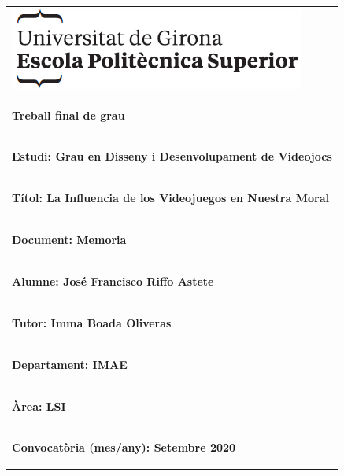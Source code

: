 \documentclass[12pt]{article}
\begin{document}
\pagestyle{empty}
\begin{tabular}{|p{\textwidth}|}
    \hline
    \vspace{.5mm}
    \includegraphics[scale=.7]{imgs/udg.png}\\
    \bigskip
    \begin{center}
        \begin{Huge} \textbf{Treball final de grau} \end{Huge}
    \end{center}\\
    \hline
    \vspace{1mm}
    \begin{large} \textbf{Estudi: Grau en Disseny i Desenvolupament de Videojocs} \end{large}
    \vspace{5mm}\\
    \hline
    \vspace{1mm}
    \begin{large} \textbf{Títol: La Influencia de los Videojuegos en Nuestra Moral} \end{large}
    \vspace{5mm}\\
    \hline
    \vspace{1mm}
    \begin{large} \textbf{Document: Memoria} \end{large}
    \vspace{5mm}\\
    \hline
    \vspace{1mm}
    \begin{large} \textbf{Alumne: José Francisco Riffo Astete} \end{large}
    \vspace{5mm}\\
    \hline
    \vspace{1mm}
    \begin{large} \textbf{Tutor: Imma Boada Oliveras} \end{large}\\
    \begin{large} \textbf{Departament: IMAE} \end{large}\\
    \begin{large} \textbf{Àrea: LSI} \end{large}\\[5mm]
    \hline
    \vspace{1mm}
    \begin{large} \textbf{Convocatòria (mes/any): Setembre 2020} \end{large}
    \vspace{5mm}\\
    \hline
\end{tabular}
\end{document}

